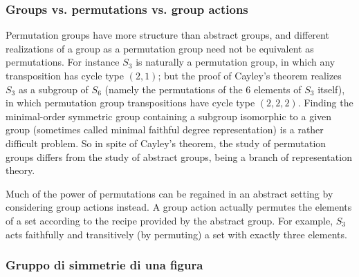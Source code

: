 \documentclass[oneside,12pt]{memoir}
\begin{document}
\subsubsection{Groups vs. permutations vs. group actions}

Permutation groups have more structure than abstract groups, and different realizations of a group as a permutation group need not be equivalent as permutations. For instance $S_3$ is naturally a permutation group, in which any transposition has cycle type $(2,1)$; but the proof of Cayley's theorem realizes $S_3$ as a subgroup of $S_6$ (namely the permutations of the 6 elements of $S_3$ itself), in which permutation group transpositions have cycle type $(2,2,2)$. Finding the minimal-order symmetric group containing a subgroup isomorphic to a given group (sometimes called minimal faithful degree representation) is a rather difficult problem. So in spite of Cayley's theorem, the study of permutation groups differs from the study of abstract groups, being a branch of representation theory.

Much of the power of permutations can be regained in an abstract setting by considering group actions instead. A group action actually permutes the elements of a set according to the recipe provided by the abstract group. For example, $S_3$ acts faithfully and transitively (by permuting) a set with exactly three elements.

\subsubsection{Gruppo di simmetrie di una figura}
\end{document}
